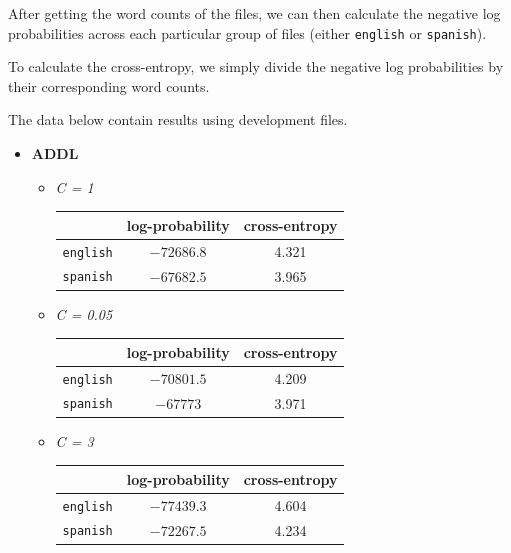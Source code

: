 \documentclass[11pt]{article}
\begin{document}
\begin{enumerate}
\begin{enumerate}[label=(\alph*)]
		After getting the word counts of the files, we can then calculate the negative log probabilities across each particular group of files (either \texttt{english} or \texttt{spanish}).

		To calculate the cross-entropy, we simply divide the negative log probabilities by their corresponding word counts.

		The data below contain results using development files.

		\begin{itemize}
		\item[] \hspace{-24pt} \textbf{ADDL}
			\begin{itemize}
			\item[] \hspace{-24pt} \textit{C = 1} 	 \vspace{4pt}
				\begin{center}\begin{tabular}{| r || c | c |}
				\hline
									& log-probability	& cross-entropy \\
				\hline \hline
				\texttt{english}	& $-72686.8$		& 4.321			\\
				\texttt{spanish}	& $-67682.5$		& 3.965			\\
				\hline
				
				\end{tabular}\end{center}
				
			\item[] \hspace{-24pt} \textit{C = 0.05} \vspace{4pt}
				\begin{center}\begin{tabular}{| r || c | c |}
				\hline
									& log-probability	& cross-entropy \\
				\hline \hline
				\texttt{english}	& $-70801.5$		& 4.209			\\
				\texttt{spanish}	& $-67773$			& 3.971			\\
				\hline
				
				\end{tabular}\end{center}

			\item[] \hspace{-24pt} \textit{C = 3} 	 \vspace{4pt}
				\begin{center}\begin{tabular}{| r || c | c |}
				\hline
									& log-probability	& cross-entropy \\
				\hline \hline
				\texttt{english}	& $-77439.3$		& 4.604			\\
				\texttt{spanish}	& $-72267.5$		& 4.234			\\
				\hline
				

\end{tabular}
\end{center}
\end{itemize}
\end{itemize}
\end{enumerate}
\end{enumerate}
\end{document}
